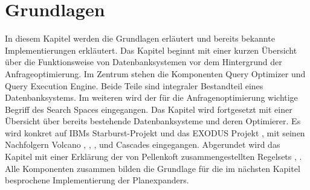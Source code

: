 \newpage
\section{Grundlagen}


In diesem Kapitel werden die Grundlagen erläutert und bereits bekannte Implementierungen erkläutert.  Das Kapitel beginnt mit einer kurzen Übersicht über die Funktionsweise von Datenbanksystemen vor dem Hintergrund der Anfrageoptimierung. Im Zentrum stehen die Komponenten Query Optimizer und Query Execution Engine. Beide Teile sind integraler Bestandteil eines Datenbanksystems. Im weiteren wird der für die Anfragenoptimierung wichtige Begriff des Search Spaces eingegangen. Das Kapitel wird fortgesetzt mit einer Übersicht über bereits bestehende Datenbanksysteme und deren Optimierer. Es wird konkret auf IBMs Starburst-Projekt und das EXODUS Projekt \cite{graefe1987exodus}, \cite{carey1990exodus} mit seinen Nachfolgern Volcano \cite{graefe1990parallelizing}, \cite{graefe1990encapsulation}, \cite{graefe1993volcano}, \cite{graefe1994volcano} und Cascades \cite{graefe1995cascades} eingegangen. Abgerundet wird das Kapitel mit einer Erklärung der von Pellenkoft zusammengestellten Regelsets \cite{pellenkoft1997complexity}, \cite{pellenkoft1997duplicate}. Alle Komponenten zusammen bilden die Grundlage für die im nächsten Kapitel besprochene Implementierung der Planexpanders.










